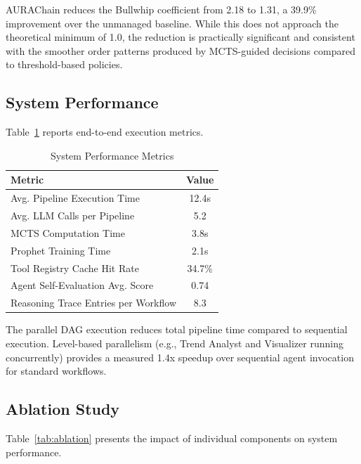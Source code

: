 \documentclass[conference]{IEEEtran}
\begin{document}
AURAChain reduces the Bullwhip coefficient from 2.18 to 1.31, a 39.9\% improvement over the unmanaged baseline. While this does not approach the theoretical minimum of 1.0, the reduction is practically significant and consistent with the smoother order patterns produced by MCTS-guided decisions compared to threshold-based policies.

\subsection{System Performance}

Table~\ref{tab:system_performance} reports end-to-end execution metrics.

\begin{table}[htbp]
\caption{System Performance Metrics}
\label{tab:system_performance}
\centering
\begin{tabular}{@{}lc@{}}
\toprule
\textbf{Metric} & \textbf{Value} \\
\midrule
Avg. Pipeline Execution Time & 12.4s \\
Avg. LLM Calls per Pipeline & 5.2 \\
MCTS Computation Time & 3.8s \\
Prophet Training Time & 2.1s \\
Tool Registry Cache Hit Rate & 34.7\% \\
Agent Self-Evaluation Avg. Score & 0.74 \\
Reasoning Trace Entries per Workflow & 8.3 \\
\bottomrule
\end{tabular}
\end{table}

The parallel DAG execution reduces total pipeline time compared to sequential execution. Level-based parallelism (e.g., Trend Analyst and Visualizer running concurrently) provides a measured 1.4x speedup over sequential agent invocation for standard workflows.

\subsection{Ablation Study}

Table~\ref{tab:ablation} presents the impact of individual components on system performance.
\end{document}
